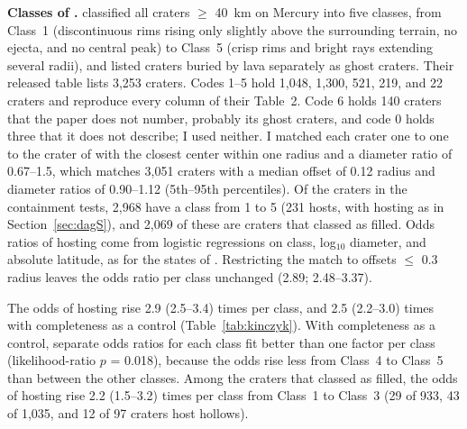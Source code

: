\documentclass{planetary}
\begin{document}
\textbf{Classes of \textcite{kinczykMorphologicalEvaluationCrater2020}.} \textcite{kinczykMorphologicalEvaluationCrater2020} classified all craters $\geq$ 40~km on Mercury into five classes, from Class~1 (discontinuous rims rising only slightly above the surrounding terrain, no ejecta, and no central peak) to Class~5 (crisp rims and bright rays extending several radii), and listed craters buried by lava separately as ghost craters. Their released table lists 3,253 craters. Codes 1--5 hold 1,048, 1,300, 521, 219, and 22 craters and reproduce every column of their Table~2. Code 6 holds 140 craters that the paper does not number, probably its ghost craters, and code 0 holds three that it does not describe; I used neither. I matched each crater one to one to the crater of \textcite{herrick2018} with the closest center within one radius and a diameter ratio of 0.67--1.5, which matches 3,051 craters with a median offset of 0.12 radius and diameter ratios of 0.90--1.12 (5th--95th percentiles). Of the craters in the containment tests, 2,968 have a class from 1 to 5 (231 hosts, with hosting as in Section~\ref{sec:dagS}), and 2,069 of these are craters that \textcite{herrick2018} classed as filled. Odds ratios of hosting come from logistic regressions on class, log$_{10}$ diameter, and absolute latitude, as for the states of \textcite{herrick2018}. Restricting the match to offsets $\leq$ 0.3 radius leaves the odds ratio per class unchanged (2.89; 2.48--3.37).

The odds of hosting rise 2.9 (2.5--3.4) times per class, and 2.5 (2.2--3.0) times with completeness as a control (Table~\ref{tab:kinczyk}). With completeness as a control, separate odds ratios for each class fit better than one factor per class (likelihood-ratio $p$ = 0.018), because the odds rise less from Class~4 to Class~5 than between the other classes. Among the craters that \textcite{herrick2018} classed as filled, the odds of hosting rise 2.2 (1.5--3.2) times per class from Class~1 to Class~3 (29 of 933, 43 of 1,035, and 12 of 97 craters host hollows).
\end{document}
